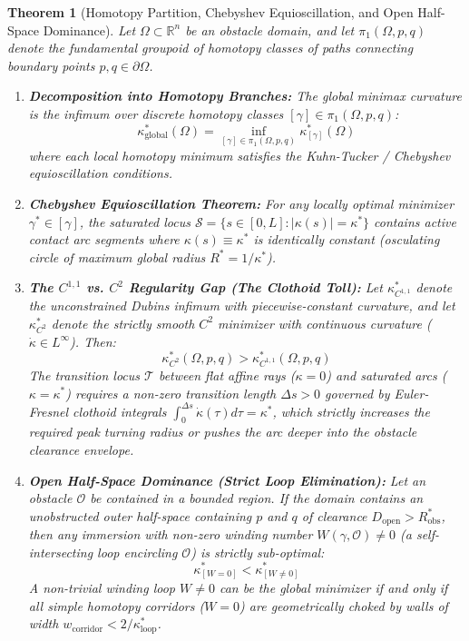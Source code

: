 \documentclass[11pt,reqno]{amsart}
\newtheorem{theorem}{Theorem}[section]
\theoremstyle{definition}
\providecommand{\R}{\mathbb{R}}
\numberwithin{equation}{section}
\providecommand{\R}{\mathbb{R}}
\begin{document}
\begin{theorem}[Homotopy Partition, Chebyshev Equioscillation, and Open Half-Space Dominance]
\label{thm:homotopy_equioscillation}
Let $\Omega \subset \R^n$ be an obstacle domain, and let $\pi_1(\Omega, p, q)$ denote the fundamental groupoid of homotopy classes of paths connecting boundary points $p, q \in \partial\Omega$.
\begin{enumerate}
    \item \textbf{Decomposition into Homotopy Branches:} The global minimax curvature is the infimum over discrete homotopy classes $[\gamma] \in \pi_1(\Omega, p, q)$:
    \begin{equation}
    \kappa^*_{\mathrm{global}}(\Omega) = \inf_{[\gamma] \in \pi_1(\Omega, p, q)} \kappa^*_{[\gamma]}(\Omega)
    \end{equation}
    where each local homotopy minimum satisfies the Kuhn-Tucker / Chebyshev equioscillation conditions.
    \item \textbf{Chebyshev Equioscillation Theorem:} For any locally optimal minimizer $\gamma^* \in [\gamma]$, the saturated locus $\mathcal{S} = \{s \in [0, L] : |\kappa(s)| = \kappa^*\}$ contains active contact arc segments where $\kappa(s) \equiv \kappa^*$ is identically constant (osculating circle of maximum global radius $R^* = 1/\kappa^*$).
    \item \textbf{The $C^{1,1}$ vs. $C^2$ Regularity Gap (The Clothoid Toll):} Let $\kappa^*_{C^{1,1}}$ denote the unconstrained Dubins infimum with piecewise-constant curvature, and let $\kappa^*_{C^2}$ denote the strictly smooth $C^2$ minimizer with continuous curvature ($\dot{\kappa} \in L^\infty$). Then:
    \begin{equation}
    \kappa^*_{C^2}(\Omega, p, q) > \kappa^*_{C^{1,1}}(\Omega, p, q)
    \end{equation}
    The transition locus $\mathcal{T}$ between flat affine rays ($\kappa = 0$) and saturated arcs ($\kappa = \kappa^*$) requires a non-zero transition length $\Delta s > 0$ governed by Euler-Fresnel clothoid integrals $\int_0^{\Delta s} \dot{\kappa}(\tau) d\tau = \kappa^*$, which strictly increases the required peak turning radius or pushes the arc deeper into the obstacle clearance envelope.
    \item \textbf{Open Half-Space Dominance (Strict Loop Elimination):} Let an obstacle $\mathcal{O}$ be contained in a bounded region. If the domain contains an unobstructed outer half-space containing $p$ and $q$ of clearance $D_{\mathrm{open}} > R^*_{\mathrm{obs}}$, then any immersion with non-zero winding number $W(\gamma, \mathcal{O}) \neq 0$ (a self-intersecting loop encircling $\mathcal{O}$) is strictly sub-optimal:
    \begin{equation}
    \kappa^*_{[W=0]} < \kappa^*_{[W \neq 0]}
    \end{equation}
    A non-trivial winding loop $W \neq 0$ can be the global minimizer \emph{if and only if} all simple homotopy corridors ($W = 0$) are geometrically choked by walls of width $w_{\mathrm{corridor}} < 2 / \kappa^*_{\mathrm{loop}}$.
\end{enumerate}
\end{theorem}
\end{document}

